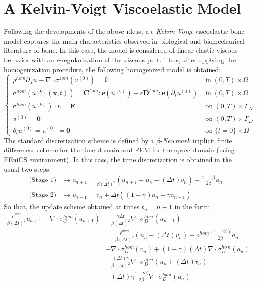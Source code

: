 \section{A Kelvin-Voigt Viscoelastic Model}
Following the developments of the above ideas, a $\epsilon$-\textit{Kelvin-Voigt} viscoelastic bone model captures the main characteristics observed in biological and biomechanical literature of bone. In this case, the model is considered of linear elastic-viscous behavior with an $\epsilon$-regularization of the viscous part.
Thus, after applying the homogenization procedure, the following homogenized model is obtained:
\begin{equation*}
    \left \{
    \begin{array}{cc}
        \rho^{hom} \partial_{tt} u - \nabla \cdot \sigma^{hom}(u^{(0)}) = 0 & \text{ in } (0,T)\times\Omega\\
        \sigma^{hom}(u^{(0)}(\mathbf{x},t)) =  \mathbf{C}^{hom}:\mathbf{e}(u^{(0)}) + \epsilon \mathbf{D}^{hom}:\mathbf{e}(\partial_{t}u^{(0)}) & \text{ in }(0,T)\times \Omega\\
        \sigma^{hom}(u^{(0)})\cdot n = \mathbf{F} & \text{ on }(0,T)\times\Gamma_N\\
        u^{(0)} = \mathbf{0} & \text{ on }(0,T)\times\Gamma_D \\
    \partial_t u^{(0)} = u^{(0)} = \mathbf{0} &  \text{ on } \{t=0\}\times\Omega
    \end{array}
    \right .
\end{equation*}
The standard discretization scheme is defined by a $\beta$-\textit{Newmark} implicit finite differences scheme for the time domain and FEM for the space domain (using FEniCS environment). In this case, the time discretization is obtained in the usual two steps:
\begin{align*}
    \text{(Stage 1)} &\longrightarrow a_{n+1} = \frac{1}{\beta (\Delta t)^2} (u_{n+1}-u_{n}-(\Delta t)v_n) - \frac{1-2\beta}{2\beta}a_n\\
    \text{(Stage 2)}& \longrightarrow v_{n+1} = v_n + \Delta t((1-\gamma)a_n + \gamma a_{n+1})
\end{align*}
So that, the update scheme obtained at times $t_n = n+1$ in the form:
\begin{align*}
    \frac{\rho^{hom}}{\beta (\Delta t)^2} u_{n+1} - \nabla \cdot \sigma_C^{hom}( u_{n+1})  & - \frac{\gamma \Delta t}{\beta (\Delta t)^2} \nabla \cdot \sigma_D^{hom}(u_{n+1}) \\
    &= \frac{\rho^{hom}}{\beta (\Delta t)^2} (u_n + (\Delta t)v_n) + \rho^{hom}\frac{ (1-2\beta)}{2\beta} a_n \\
    & + \nabla \cdot \sigma_D^{hom}(v_n) + (1-\gamma)(\Delta t) \nabla\cdot \sigma_D^{hom}(a_n) \\
    & - \frac{(\Delta t)\gamma}{\beta (\Delta t)^2}\nabla \cdot \sigma_D^{hom}(u_n + (\Delta t)v_n) \\
    & - (\Delta t)\gamma\frac{1-2\beta}{2 \beta} \nabla \cdot \sigma_D^{hom}(a_n)
\end{align*}

